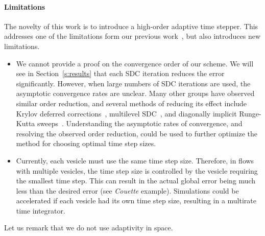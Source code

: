 \paragraph{Limitations}
The novelty of this work is to introduce a high-order adaptive time
stepper.  This addresses one of the limitations form our previous
work~\cite{qua:bir2014b}, but also introduces new limitations.
\begin{itemize}
  \item We cannot provide a proof on the convergence order of our
  scheme.  We will see in Section~\ref{s:results} that each SDC
  iteration reduces the error significantly. However, when large
  numbers of SDC iterations are used, the asymptotic convergence rates
  are unclear.  Many other groups have observed similar order
  reduction, and several methods of reducing its effect include Krylov
  deferred corrections~\cite{hua:jia:min2006, hua:jia:min2007,
  bu:hua:min2012, bu:hua:min2009, jia:hua2008}, multilevel
  SDC~\cite{emm:min2012, min:spe:bol:emm:rup2015,
  spe:rup:emm:min:bol:kra2014, spe:rup:emm:bol:kra2014}, and diagonally
  implicit Runge-Kutta sweeps~\cite{wei2013}.  Understanding the
  asymptotic rates of convergence, and resolving the observed order
  reduction, could be used to further optimize the method for choosing
  optimal time step sizes.


  \item Currently, each vesicle must use the same time step size.
  Therefore, in flows with multiple vesicles, the time step size is
  controlled by the vesicle requiring the smallest time step.  This can
  result in the actual global error being much less than the desired
  error (see {\em Couette} example).  Simulations could be accelerated
  if each vesicle had its own time step size, resulting in a multirate
  time integrator.

\end{itemize}

Let us remark that we do not use adaptivity in space.



